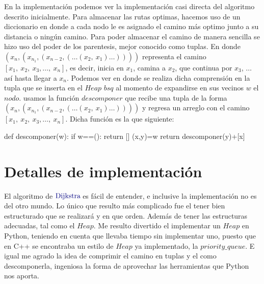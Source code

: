 \documentclass[12pt,a4paper]{article}
\newcommand{\dijkstra}{$\textcolor{deepblue}{\mathrm{Dijkstra}}\>$}
\begin{document}
En la implementaci\'on podemos ver la implementaci\'on casi directa del algoritmo descrito inicialmente. Para almacenar las rutas optimas, hacemos uso de un diccionario en donde a cada nodo le es asignado el camino m\'as optimo junto a su distancia o ning\'un camino. Para poder almacenar el camino de manera sencilla se hizo uso del poder de los parentesis, mejor conocido como tuplas. En donde $(x_n,(x_{n_1},(x_{n-2},(\dots (x_2,\>x_1) \dots) ) ) )$ representa el camino $[x_1,\>x_2,\>x_3,\dots,\>x_n]$, es decir, inicia en $x_1$, camina a $x_2$, que continua por $x_3$, $\dots$ as\'i hasta llegar a $x_n$. Podemos ver en donde se realiza dicha comprensi\'on en la tupla que se inserta en el $Heap$ $bsq$ al momento de expandirse en sus vecinos $w$ el $nodo$. usamos la funci\'on $descomponer$ que recibe una tupla de la forma $(x_n,(x_{n_1},(x_{n-2},(\dots (x_2,\>x_1) \dots) ) ) )$ y regresa un arreglo con el camino $[x_1,\>x_2,\>x_3,\dots,\>x_n]$. Dicha funci\'on es la que siguiente:

\begin{python}
def descomponer(w):
    if w==():
        return []
    (x,y)=w
    return descomponer(y)+[x]
\end{python}




\section{Detalles de implementaci\'on}
El algoritmo de \dijkstra es f\'acil de entender, e inclusive la implementaci\'on no es del otro mundo. Lo \'unico que resulto m\'as complicado fue el tener bien estructurado que se realizar\'a y en que orden. Adem\'as de tener las estructuras adecuadas, tal como el $Heap$. Me resulto divertido el implementar un $Heap$ en Python, teniendo en cuenta que llevaba tiempo sin implementar uno, puesto que en C++ se encontraba un estilo de $Heap$ ya implementado, la $priority\_queue$. E igual me agrado la idea de comprimir el camino en tuplas y el como descomponerla, ingeniosa la forma de aprovechar las herramientas que Python nos aporta.
\end{document}
